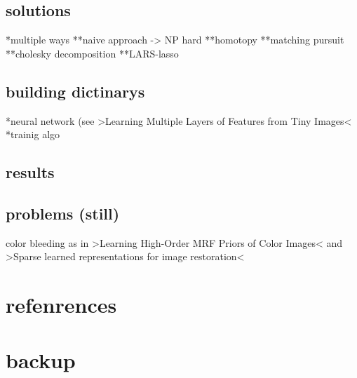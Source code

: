 \subsection{solutions}
\begin{frame}
*multiple ways
**naive approach -> NP hard
**homotopy
**matching pursuit
**cholesky decomposition
**LARS-lasso
\end{frame}

\subsection{building dictinarys}
\begin{frame}
*neural network (see >Learning Multiple Layers of Features from Tiny Images<
*trainig algo
\end{frame}

\subsection{results}
\begin{frame}
\end{frame}

\subsection{problems (still)}
\begin{frame}
color bleeding as in >Learning High-Order MRF Priors of Color Images< and >Sparse learned representations for image restoration<
\end{frame}

\section{refenrences}
\begin{frame}
\end{frame}

\section{backup}
\begin{frame}
\end{frame}
